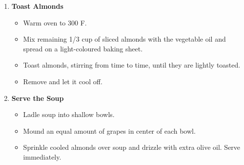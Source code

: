 \documentclass[11pt,letterpaper]{article}
\begin{document}
\begin{description}
\begin{enumerate}
	\item {\bf Toast Almonds}
	\begin{itemize}
	\item Warm oven to 300 F.
	\item Mix remaining 1/3 cup of sliced almonds with the vegetable oil and spread on a light-coloured baking sheet.
	\item Toast almonds, stirring from time to time, until they are lightly toasted.
	\item Remove and let it cool off.
	\end{itemize}
	
	\item {\bf Serve the Soup}
	\begin{itemize}
	\item  Ladle soup into shallow bowls. 
	\item Mound an equal amount of grapes in center of each bowl. 
	\item Sprinkle cooled almonds over soup and drizzle with extra olive oil. Serve immediately.
	\end{itemize}

	\end{enumerate}
\end{description}
\end{document}
